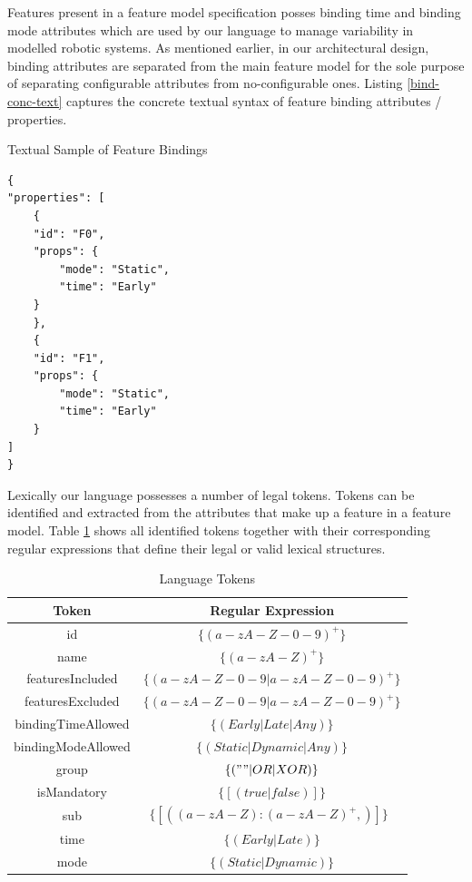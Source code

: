 Features  present in a feature model specification posses binding time and binding mode attributes which are used by our language to manage variability in modelled robotic systems. As mentioned earlier, in our architectural design, binding attributes are separated from the main feature model for the sole purpose of separating configurable attributes from no-configurable ones. Listing
\ref{bind-conc-text} captures the concrete textual syntax of feature binding attributes / properties. 
\begin{listing}
\caption{Textual Sample of Feature Bindings}
\begin{verbatim}
{
"properties": [
    {
    "id": "F0",
    "props": {
        "mode": "Static",
        "time": "Early"
    }
    },
    {
    "id": "F1",
    "props": {
        "mode": "Static",
        "time": "Early"
    }
]
}
\end{verbatim}
\label{bind-conc-text}
\end{listing}

\begin{table}[htbp]
\caption{Language Tokens}
Lexically our language possesses a number of legal tokens. Tokens can be identified and extracted from the attributes that make up a feature in a feature model. Table \ref{tab:langlex} shows all identified tokens together with their corresponding regular expressions that define their legal or valid lexical structures.
\begin{center}
\begin{tabular}{|c|c|}
\hline
    Token & Regular Expression \\\hline
                             id & $\{(a-zA-Z-0-9)^+\}$  \\\hline
                             name & $\{(a-zA-Z)^+\}$ \\ \hline
                             featuresIncluded & $\{(a-zA-Z-0-9 | a-zA-Z-0-9)^+\}$  \\ \hline
                             featuresExcluded & $\{(a-zA-Z-0-9 | a-zA-Z-0-9)^+\}$\\ \hline
                             bindingTimeAllowed & $\{(Early | Late | Any)\}$\\ \hline
                             bindingModeAllowed & $\{(Static | Dynamic | Any)\}$\\\hline
                             group & $\{("" | OR | XOR)\}$\\ \hline
                             isMandatory & $\{[(true | false)]\}$\\ \hline
                             sub & $\{[({(a-zA-Z):(a-zA-Z)}^+,)]\}$\ \\ \hline
                             time & $\{(Early | Late)\}$\\ \hline
                             mode & $\{(Static | Dynamic)\}$\\ \hline
\end{tabular}
\label{tab:langlex}
\end{center}
\end{table}


